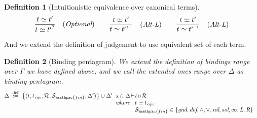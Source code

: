 \documentclass[12pt]{article}
\newtheorem{Definition}{Definition}[section]
\begin{document}
\begin{Definition}[Intuitionistic equivalence over canonical terms]
\begin{displaymath}
\begin{array}{c}
      \begin{array}{rll}
        \begin{array}{rl}
          \dfrac{
            t \simeq t'
          }{
            t \simeq {t'}^?
          }  &  (\text{\it Optional})
        \end{array}

        & \begin{array}{rl}
            \dfrac{
              t \simeq t'
            }{
              t \simeq {t'}^\leftarrow
            }  &  (\text{\it Alt-L})
          \end{array}
        
        & \begin{array}{rl}
            \dfrac{
              t \simeq t'
            }{
              t \simeq {t'}^\rightarrow
            }  &  (\text{\it Alt-L})
          \end{array}
      \end{array}
      
    \end{array}
  \end{displaymath}
\end{Definition}

And we extend the definition of judgement to use equivalent set of each
term.


\pagebreak
\begin{Definition}[Binding pentagram]
  We extend the definition of bindings range over $\Gamma$ we have defined
  above, and we call the extended ones range over $\Delta$  as binding
  pentagram.
  \begin{displaymath}
    \Delta \;\stackrel{\mathrm{def}}{:=}\;
     \bigl\{(t, t_{\text{\it equ}}, \mathcal{R},
      \mathcal{S}_{\mathpzc{fin}}, \Delta') \bigr\} \cup \Delta'
      \begin{array}[t]{l}
        \text{\it s.t.}\ \Delta \!\vdash\! t \triangleright \!\mathcal{R} \\
        \text{\it where}\ \begin{array}[t]{l}
         t \simeq t_{\text{\it equ}}  \\
        \mathcal{S}_{\mathpzc{fin}}\in \{\text{\it gnd},
         \text{\it def}, \wedge, \vee, \text{\it nil}, \text{\it sol},
          \infty, \text{\it L}, \text{\it R}\}
        \end{array}
      \end{array}
  \end{displaymath}
\end{Definition}
\end{document}
